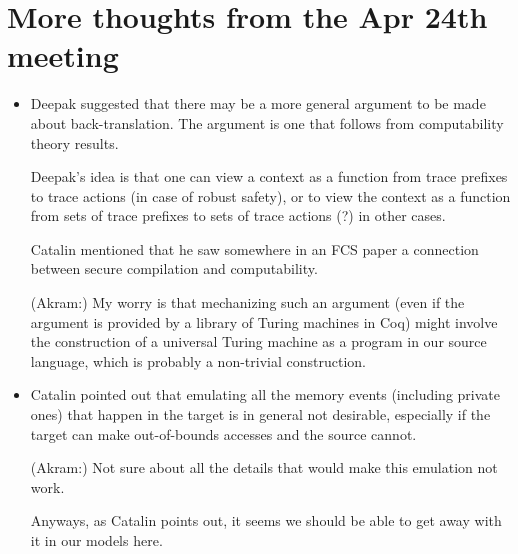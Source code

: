 \documentclass[12pt,a4paper]{article}
\begin{document}
\section{More thoughts from the Apr 24th meeting}

\begin{itemize}
\item Deepak suggested that there may be a more general
argument to be made about back-translation. The argument is one
that follows from computability theory results.

Deepak's idea is that one can view a context as a function
from trace prefixes to trace actions (in case of robust safety), or
to view the context as a function from sets of trace prefixes 
to sets of trace actions (?) in other cases.

Catalin mentioned that he saw somewhere in an FCS paper
a connection between secure compilation and computability.

(Akram:) My worry is that mechanizing such an argument
(even if the argument is provided by a library of Turing machines
in Coq) might involve the construction of a
universal Turing machine
as a program in our source language, which is probably a non-trivial
construction.

\item Catalin pointed out that emulating all the memory
events (including private ones)
 that happen in the target is in general not desirable,
especially if the target can make out-of-bounds accesses
and the source cannot.

(Akram:) Not sure about all the details that would
make this emulation not work.

Anyways, as Catalin points out, it seems we should be able to
get away with it in our models here.
\end{itemize}
\end{document}
